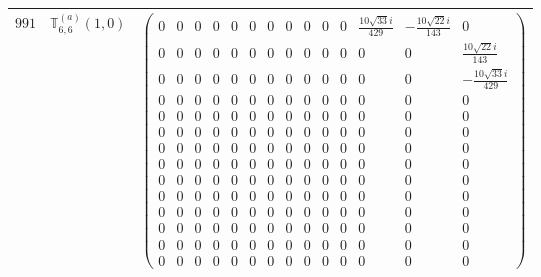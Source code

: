 \documentclass[fleqn,8pt,landscape]{jsarticle}
\begin{document}
\begin{center}
\begin{longtable}{ccc}
$ 991 $ & $ \mathbb{T}_{6,6}^{(a)}(1,0) $ & $ \begin{pmatrix} 0 & 0 & 0 & 0 & 0 & 0 & 0 & 0 & 0 & 0 & 0 & \frac{10 \sqrt{33} i}{429} & - \frac{10 \sqrt{22} i}{143} & 0 \\ 0 & 0 & 0 & 0 & 0 & 0 & 0 & 0 & 0 & 0 & 0 & 0 & 0 & \frac{10 \sqrt{22} i}{143} \\ 0 & 0 & 0 & 0 & 0 & 0 & 0 & 0 & 0 & 0 & 0 & 0 & 0 & - \frac{10 \sqrt{33} i}{429} \\ 0 & 0 & 0 & 0 & 0 & 0 & 0 & 0 & 0 & 0 & 0 & 0 & 0 & 0 \\ 0 & 0 & 0 & 0 & 0 & 0 & 0 & 0 & 0 & 0 & 0 & 0 & 0 & 0 \\ 0 & 0 & 0 & 0 & 0 & 0 & 0 & 0 & 0 & 0 & 0 & 0 & 0 & 0 \\ 0 & 0 & 0 & 0 & 0 & 0 & 0 & 0 & 0 & 0 & 0 & 0 & 0 & 0 \\ 0 & 0 & 0 & 0 & 0 & 0 & 0 & 0 & 0 & 0 & 0 & 0 & 0 & 0 \\ 0 & 0 & 0 & 0 & 0 & 0 & 0 & 0 & 0 & 0 & 0 & 0 & 0 & 0 \\ 0 & 0 & 0 & 0 & 0 & 0 & 0 & 0 & 0 & 0 & 0 & 0 & 0 & 0 \\ 0 & 0 & 0 & 0 & 0 & 0 & 0 & 0 & 0 & 0 & 0 & 0 & 0 & 0 \\ 0 & 0 & 0 & 0 & 0 & 0 & 0 & 0 & 0 & 0 & 0 & 0 & 0 & 0 \\ 0 & 0 & 0 & 0 & 0 & 0 & 0 & 0 & 0 & 0 & 0 & 0 & 0 & 0 \\ 0 & 0 & 0 & 0 & 0 & 0 & 0 & 0 & 0 & 0 & 0 & 0 & 0 & 0 \end{pmatrix} $ \\ \hline

\end{longtable}
\end{center}
\end{document}
